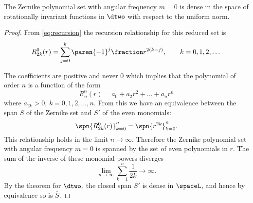 \begin{theorem}
The Zernike polynomial set with angular frequency $m=0$ is dense in the space of rotationally invariant functions in $\dtwo$ with respect to the uniform norm.
\label{th:zernike}
\end{theorem}
\begin{proof}
From \eqref{eq:recursion} the recursion relationship for this reduced set is
  \begin{equation}
    R_{2k}^{0}(r) = \sum_{j=0}^{k} \paren{-1}^{j} \fraction r^{2(k-j)}, \qquad k= 0,1,2,\dots
  \end{equation}

The coefficients are positive and never 0 which implies that the polynomial of order $n$ is a function of the form 
$$R_{n}^{0}(r) = a_{0}+a_{2}r^{2}+\dots+a_{n}r^{n}$$
where $a_{2k}>0$, $k=0,1,2,\dots,n$. From this we have an equivalence between the span $S$ of the Zernike set and $S'$ of the even monomials:
%
$$\spn{R_{2k}^{0}(r)}_{k=0}^{n} = \spn{r^{2k}}_{k=0}^{n}.$$
%
This relationship holds in the limit $n\to\infty$. Therefore the Zernike polynomial set with angular frequency $m=0$ is spanned by the set of even polynomials in $r$. The sum of the inverse of these monomial powers diverges
$$\lim_{n\to\infty}\sum_{k=1}^{n}\frac{1}{2k}\to\infty.$$
By the \ms theorem for $\dtwo$, the closed span $\overline{S'}$ is dense in $\spaceL$, and hence by equivalence so is $\overline{S}$.
\end{proof}

\endinput %